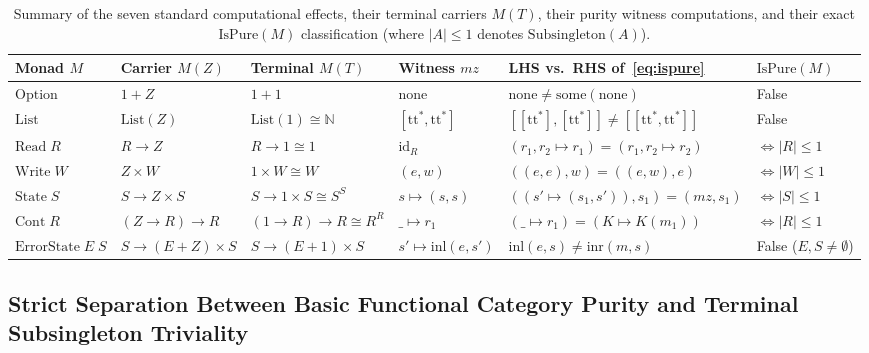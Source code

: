 \documentclass[11pt,a4paper]{article}
\theoremstyle{definition}
\theoremstyle{remark}
\newcommand{\id}{\mathrm{id}}
\newcommand{\ttstar}{\mathrm{tt}^*}
\begin{document}
\begin{table}[htbp]
\centering
\scriptsize
\setlength{\tabcolsep}{3.5pt}
\renewcommand{\arraystretch}{1.25}
\begin{tabular}{@{}llllll@{}}
\toprule
\textbf{Monad $M$} & \textbf{Carrier $M(Z)$} & \textbf{Terminal $M(T)$} & \textbf{Witness $mz$} & \textbf{LHS vs.\ RHS of~\eqref{eq:ispure}} & \textbf{$\mathrm{IsPure}(M)$} \\
\midrule
$\mathrm{Option}$ & $1 + Z$ & $1 + 1$ & $\mathrm{none}$ & $\mathrm{none} \neq \mathrm{some}(\mathrm{none})$ & False \\
$\mathrm{List}$ & $\mathrm{List}(Z)$ & $\mathrm{List}(1) \cong \mathbb{N}$ & $[\ttstar, \ttstar]$ & $[[\ttstar],[\ttstar]] \neq [[\ttstar,\ttstar]]$ & False \\
$\mathrm{Read}\;R$ & $R \to Z$ & $R \to 1 \cong 1$ & $\id_R$ & $(r_1, r_2 \mapsto r_1) = (r_1, r_2 \mapsto r_2)$ & $\iff |R| \le 1$ \\
$\mathrm{Write}\;W$ & $Z \times W$ & $1 \times W \cong W$ & $(e, w)$ & $((e,e), w) = ((e,w), e)$ & $\iff |W| \le 1$ \\
$\mathrm{State}\;S$ & $S \to Z \times S$ & $S \to 1 \times S \cong S^S$ & $s \mapsto (s, s)$ & $((s' \mapsto (s_1,s')), s_1) = (mz, s_1)$ & $\iff |S| \le 1$ \\
$\mathrm{Cont}\;R$ & $(Z \to R) \to R$ & $(1 \to R) \to R \cong R^R$ & $\_ \mapsto r_1$ & $(\_ \mapsto r_1) = (K \mapsto K(m_1))$ & $\iff |R| \le 1$ \\
$\mathrm{ErrorState}\;E\;S$ & $S \to (E + Z) \times S$ & $S \to (E + 1) \times S$ & $s' \mapsto \mathrm{inl}(e, s')$ & $\mathrm{inl}(e, s) \neq \mathrm{inr}(m, s)$ & False ($E, S \neq \emptyset$) \\
\bottomrule
\end{tabular}
\caption{Summary of the seven standard computational effects, their terminal carriers $M(T)$, their
purity witness computations, and their exact $\mathrm{IsPure}(M)$ classification (where $|A| \le 1$
denotes $\mathrm{Subsingleton}(A)$).}
\label{tab:effects}
\end{table}

\subsection{Strict Separation Between Basic Functional Category Purity and Terminal Subsingleton Triviality}
\end{document}
